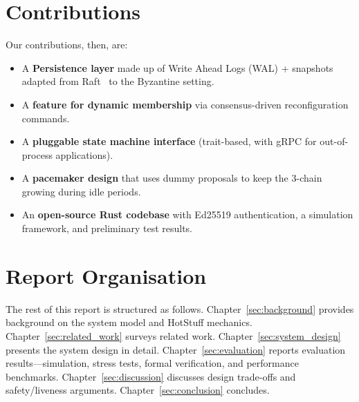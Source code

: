 \section{Contributions}

Our contributions, then, are:

\begin{itemize}
  \item A \textbf{Persistence layer} made up of Write Ahead Logs (WAL) + snapshots adapted
    from Raft~\cite{raft2014} to the Byzantine setting.
  \item A \textbf{feature for dynamic membership} via consensus-driven reconfiguration
    commands.
  \item A \textbf{pluggable state machine interface} (trait-based, with gRPC for
    out-of-process applications).
  \item A \textbf{pacemaker design} that uses dummy proposals to keep the 3-chain growing
    during idle periods.
  \item An \textbf{open-source Rust codebase} with Ed25519 authentication, a simulation
    framework, and preliminary test results.
\end{itemize}

\section{Report Organisation}

The rest of this report is structured as follows.
Chapter~\ref{sec:background} provides background on the system model and HotStuff mechanics.
Chapter~\ref{sec:related_work} surveys related work.
Chapter~\ref{sec:system_design} presents the system design in detail.
Chapter~\ref{sec:evaluation} reports evaluation results---simulation, stress tests,
formal verification, and performance benchmarks.
Chapter~\ref{sec:discussion} discusses design trade-offs and safety/liveness arguments.
Chapter~\ref{sec:conclusion} concludes.
